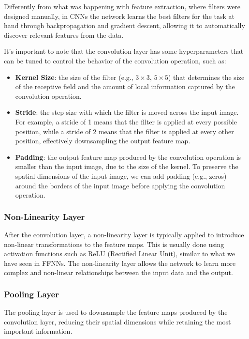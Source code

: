 Differently from what was happening with feature extraction, where filters were designed manually, 
in CNNs the network learns the best filters for the task at hand through backpropagation and gradient descent, 
allowing it to automatically discover relevant features from the data.

It's important to note that the convolution layer has some hyperparameters that can be tuned to control the behavior of the convolution operation, such as:
\begin{itemize}
    \item \textbf{Kernel Size}: the size of the filter (e.g., $3 \times 3$, $5 \times 5$) that determines the size of the receptive field and the amount 
    of local information captured by the convolution operation.
    \item \textbf{Stride}: the step size with which the filter is moved across the input image. For example, a stride of 1 means that
    the filter is applied at every possible position, while a stride of 2 means that the filter is applied at every other position, effectively downsampling the output feature map.
    \item \textbf{Padding}: the output feature map produced by the convolution operation is smaller than the input image, due to the size of the kernel.
    To preserve the spatial dimensions of the input image, we can add padding (e.g., zeros) around the borders of the input image before applying the convolution operation.
\end{itemize}

\subsubsection{Non-Linearity Layer}
After the convolution layer, a non-linearity layer is typically applied to introduce non-linear transformations to the feature maps.
This is usually done using activation functions such as ReLU (Rectified Linear Unit), similar to what we have seen in FFNNs.
The non-linearity layer allows the network to learn more complex and non-linear relationships between the input data and the output.

\subsubsection{Pooling Layer}
The pooling layer is used to downsample the feature maps produced by the convolution layer, reducing their spatial 
dimensions while retaining the most important information.

